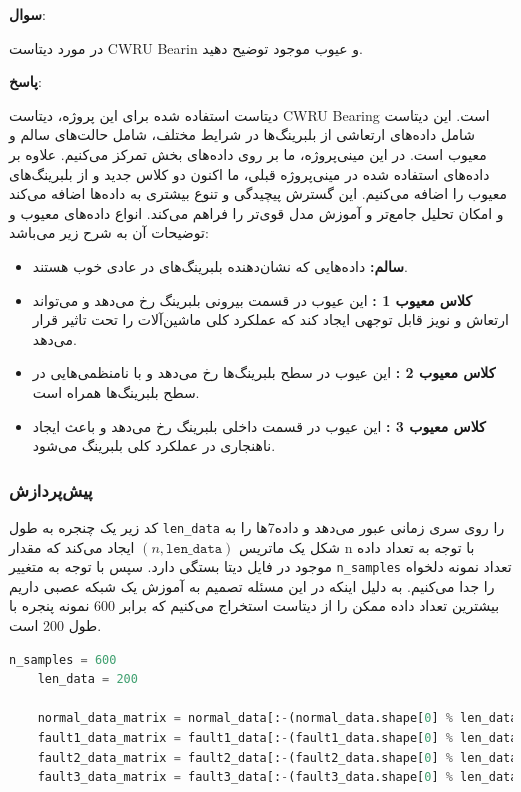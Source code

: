 \documentclass{article}
\begin{document}
{\large \textbf{سوال}:} 

در مورد دیتاست CWRU Bearin و عیوب موجود توضیح دهید. 

{\large \textbf{پاسخ}:} 

دیتاست استفاده شده برای این پروژه، دیتاست CWRU Bearing است. این دیتاست شامل داده‌های ارتعاشی از بلبرینگ‌ها در شرایط مختلف، شامل حالت‌های سالم و معیوب است. در این مینی‌پروژه، ما بر روی داده‌های بخش
 تمرکز می‌کنیم.
علاوه بر داده‌های استفاده شده در مینی‌پروژه قبلی، ما اکنون دو کلاس جدید
  و 
 از بلبرینگ‌های معیوب را اضافه می‌کنیم. این گسترش پیچیدگی و تنوع بیشتری به داده‌ها اضافه می‌کند و امکان تحلیل جامع‌تر و آموزش مدل قوی‌تر را فراهم می‌کند.
انواع داده‌های معیوب و توضیحات آن به شرح زیر می‌باشد:
\begin{itemize}
    \item \textbf{سالم:} داده‌هایی که نشان‌دهنده بلبرینگ‌های در عادی خوب هستند.
    \item \textbf{کلاس معیوب 1 :} این عیوب در قسمت بیرونی بلبرینگ رخ می‌دهد و می‌تواند ارتعاش و نویز قابل توجهی ایجاد کند که عملکرد کلی ماشین‌آلات را تحت تاثیر قرار می‌دهد.
    \item \textbf{کلاس معیوب 2 :} این عیوب در سطح بلبرینگ‌ها رخ می‌دهد و با نامنظمی‌هایی در سطح بلبرینگ‌ها همراه است.
    \item \textbf{کلاس معیوب 3 :} این عیوب در قسمت داخلی بلبرینگ رخ می‌دهد و باعث ایجاد ناهنجاری در عملکرد کلی بلبرینگ می‌شود.
\end{itemize}

\subsubsection{پیش‌پردازش}

کد زیر یک چنجره به طول 
\texttt{len\_data}
را روی سری زمانی عبور می‌دهد و داده7ها را به شکل یک ماتریس 
$(n, \texttt{len\_data})$
ایجاد می‌کند که مقدار n با توجه به تعداد داده موجود در فایل دیتا بستگی دارد. سپس با توجه به متغییر ‎\texttt{n‎\_samples} تعداد نمونه دلخواه را جدا می‌کنیم. به دلیل اینکه در این مسئله تصمیم به آموزش یک شبکه عصبی داریم بیشترین تعداد داده ممکن را از دیتاست استخراج می‌کنیم که برابر 600 نمونه پنجره با طول 200 است.‎
\begin{LTR}
	\begin{lstlisting}[language=Python, caption=Sliding Window]
	n_samples = 600
	len_data = 200
	
	normal_data_matrix = normal_data[:-(normal_data.shape[0] % len_data)].reshape(-1, len_data)
	fault1_data_matrix = fault1_data[:-(fault1_data.shape[0] % len_data)].reshape(-1, len_data)
	fault2_data_matrix = fault2_data[:-(fault2_data.shape[0] % len_data)].reshape(-1, len_data)
	fault3_data_matrix = fault3_data[:-(fault3_data.shape[0] % len_data)].reshape(-1, len_data)
	\end{lstlisting}
\end{LTR}
\end{document}
